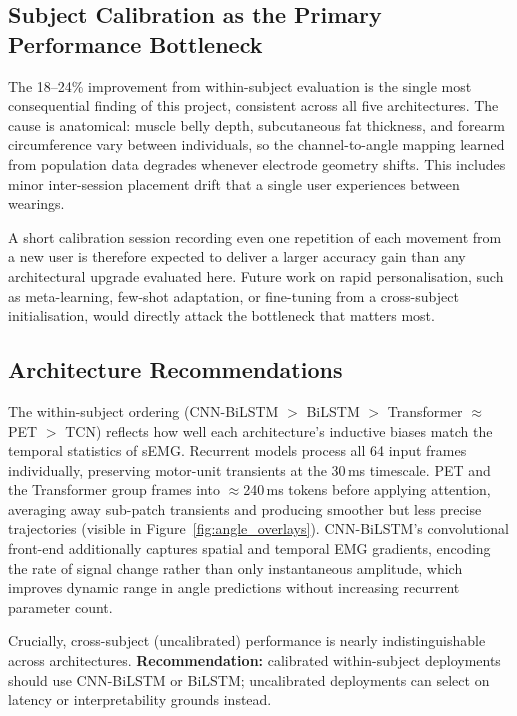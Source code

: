 \documentclass[11pt]{article}
\begin{document}
\subsection{Subject Calibration as the Primary Performance Bottleneck}
\label{sec:disc_calibration}

The 18--24\% improvement from within-subject evaluation is the single most consequential finding of this project, consistent across all five architectures. The cause is anatomical: muscle belly depth, subcutaneous fat thickness, and forearm circumference vary between individuals, so the channel-to-angle mapping learned from population data degrades whenever electrode geometry shifts. This includes minor inter-session placement drift that a single user experiences between wearings.

A short calibration session recording even one repetition of each movement from a new user is therefore expected to deliver a larger accuracy gain than any architectural upgrade evaluated here. Future work on rapid personalisation, such as meta-learning, few-shot adaptation, or fine-tuning from a cross-subject initialisation, would directly attack the bottleneck that matters most.

\subsection{Architecture Recommendations}
\label{sec:disc_architecture}

The within-subject ordering (CNN-BiLSTM $>$ BiLSTM $>$ Transformer $\approx$ PET $>$ TCN) reflects how well each architecture's inductive biases match the temporal statistics of sEMG. Recurrent models process all 64 input frames individually, preserving motor-unit transients at the 30\,ms timescale. PET and the Transformer group frames into ${\approx}$240\,ms tokens before applying attention, averaging away sub-patch transients and producing smoother but less precise trajectories (visible in Figure~\ref{fig:angle_overlays}). CNN-BiLSTM's convolutional front-end additionally captures spatial and temporal EMG gradients, encoding the rate of signal change rather than only instantaneous amplitude, which improves dynamic range in angle predictions without increasing recurrent parameter count.

Crucially, cross-subject (uncalibrated) performance is nearly indistinguishable across architectures. \textbf{Recommendation:} calibrated within-subject deployments should use CNN-BiLSTM or BiLSTM; uncalibrated deployments can select on latency or interpretability grounds instead.
\end{document}
